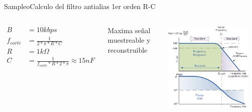  \begin{frame}{Sampleo}{Calculo del filtro antialias 1er orden R-C}
    \begin{columns}[onlytextwidth]
       \begin{align*}
          B         &= 10k bps \\
          f_{corte} &= \frac{1}{2*\pi*R*C} \\
          R         &= 1k\Omega \\
          C         &= \frac{1}{f_{corte}*R*2*\pi} \approx 15nF
       \end{align*}
          \begin{block}{Maxima señal muestreable y reconstruible}
          \end{block}
       \includegraphics[width=0.9\textwidth]{2_clase/low_pass}
    \end{columns}
    \vfill
 \end{frame}
